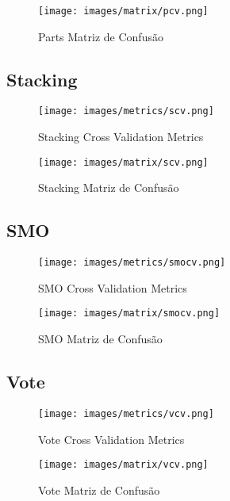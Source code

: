 \begin{figure}[H]
  \centering
  \texttt{[image: images/matrix/pcv.png]}
  \caption{Parts Matriz de Confusão}
  \label{fig:p_cv_matrix}
\end{figure}

\subsection{Stacking}

\begin{figure}[H]
  \centering
  \texttt{[image: images/metrics/scv.png]}
  \caption{Stacking Cross Validation Metrics}
  \label{fig:s_cv_metrics}
\end{figure}

\begin{figure}[H]
  \centering
  \texttt{[image: images/matrix/scv.png]}
  \caption{Stacking Matriz de Confusão}
  \label{fig:s_cv_matrix}
\end{figure}

\subsection{SMO}

\begin{figure}[H]
  \centering
  \texttt{[image: images/metrics/smocv.png]}
  \caption{SMO Cross Validation Metrics}
  \label{fig:smo_cv_metrics}
\end{figure}

\begin{figure}[H]
  \centering
  \texttt{[image: images/matrix/smocv.png]}
  \caption{SMO Matriz de Confusão}
  \label{fig:smo_cv_matrix}
\end{figure}

\subsection{Vote}

\begin{figure}[H]
  \centering
  \texttt{[image: images/metrics/vcv.png]}
  \caption{Vote Cross Validation Metrics}
  \label{fig:v_cv_metrics}
\end{figure}

\begin{figure}[H]
  \centering
  \texttt{[image: images/matrix/vcv.png]}
  \caption{Vote Matriz de Confusão}
  \label{fig:v_cv_matrix}
\end{figure}
